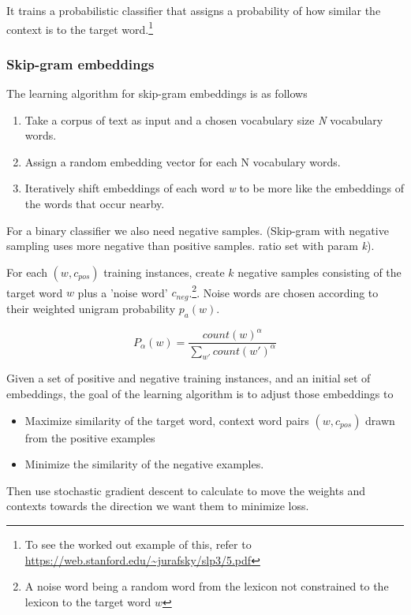 \documentclass[11pt]{article}
\begin{document}
It trains a probabilistic classifier that assigns a probability of how similar the context is to the target word.\footnote{To see the worked out example of this, refer to \url{https://web.stanford.edu/~jurafsky/slp3/5.pdf}}

\subsubsection{Skip-gram embeddings}

The learning algorithm for skip-gram embeddings is as follows

\begin{enumerate}
	\item Take a corpus of text as input and a chosen vocabulary size \textit{N} vocabulary words.
	\item Assign a random embedding vector for each N vocabulary words.
	\item Iteratively shift embeddings of each word \textit{w} to be more like the embeddings of the words that occur nearby.
\end{enumerate}

For a binary classifier we also need negative samples. (Skip-gram with negative sampling uses more negative than positive samples. ratio set with param \textit{k}).

For each $(w,c_{pos})$ training instances, create $k$ negative samples consisting of the target word $w$ plus a 'noise word' $c_{neg}$.\footnote{A noise word being a random word from the lexicon not constrained to the lexicon to the target word $w$}. Noise words are chosen according to their weighted unigram probability $p_a(w)$.

\begin{equation*}
	P_{\alpha}(w) = \frac{count(w)^\alpha}{\sum_{w'}count(w')^\alpha}
\end{equation*}

Given a set of positive and negative training instances, and an initial set of embeddings, the goal of the learning algorithm is to adjust those embeddings to


\begin{itemize}
	\item Maximize similarity of the target word, context word pairs $(w, c_{pos})$ drawn from the positive examples
	\item Minimize the similarity of the negative examples.
\end{itemize}

Then use stochastic gradient descent to calculate to move the weights and contexts towards the direction we want them to minimize loss.
\end{document}
